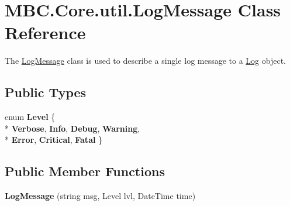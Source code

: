 \hypertarget{class_m_b_c_1_1_core_1_1util_1_1_log_message}{\section{M\-B\-C.\-Core.\-util.\-Log\-Message Class Reference}
\label{class_m_b_c_1_1_core_1_1util_1_1_log_message}
}


The \hyperlink{class_m_b_c_1_1_core_1_1util_1_1_log_message}{Log\-Message} class is used to describe a single log message to a \hyperlink{class_m_b_c_1_1_core_1_1util_1_1_log}{Log} object. 


\subsection*{Public Types}
\begin{DoxyCompactItemize}
\item 
enum {\bfseries Level} \{ \\*
{\bfseries Verbose}, 
{\bfseries Info}, 
{\bfseries Debug}, 
{\bfseries Warning}, 
\\*
{\bfseries Error}, 
{\bfseries Critical}, 
{\bfseries Fatal}
 \}
\end{DoxyCompactItemize}
\subsection*{Public Member Functions}
\begin{DoxyCompactItemize}
\item 
\hypertarget{class_m_b_c_1_1_core_1_1util_1_1_log_message_a28227ed3687ed1b74fd4553373d9caee}{{\bfseries Log\-Message} (string msg, Level lvl, Date\-Time time)}\label{class_m_b_c_1_1_core_1_1util_1_1_log_message_a28227ed3687ed1b74fd4553373d9caee}

\end{DoxyCompactItemize}
